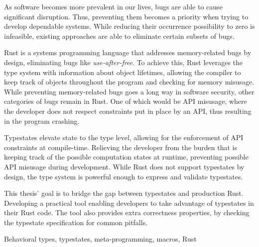 
As software becomes more prevalent in our lives, bugs are able to cause significant disruption.
Thus, preventing them becomes a priority when trying to develop dependable systems.
While reducing their occurrence possibility to zero is infeasible,
existing approaches are able to eliminate certain subsets of bugs.

Rust is a systems programming language that addresses memory-related bugs by design,
eliminating bugs like \emph{use-after-free}.
To achieve this, Rust leverages the type system with information about object lifetimes,
allowing the compiler to keep track of objects throughout the program and checking for memory misusage.
While preventing memory-related bugs goes a long way in software security, other categories of bugs remain in Rust.
One of which would be API misusage, where the developer does not respect constraints put in place by an API,
thus resulting in the program crashing.

Typestates elevate state to the type level, allowing for the enforcement of API constraints at compile-time.
Relieving the developer from the burden that is keeping track of the possible computation states at runtime,
preventing possible API misusage during development.
While Rust does not support typestates by design,
the type system is powerful enough to express and validate typestates.

This thesis' goal is to bridge the gap between typestates and production Rust.
Developing a practical tool enabling developers to take advantage of typestates in their Rust code.
The tool also provides extra correctness properties, by checking the typestate specification for common pitfalls.

\begin{keywords}
Behavioral types, typestates, meta-programming, macros, Rust
\end{keywords}
